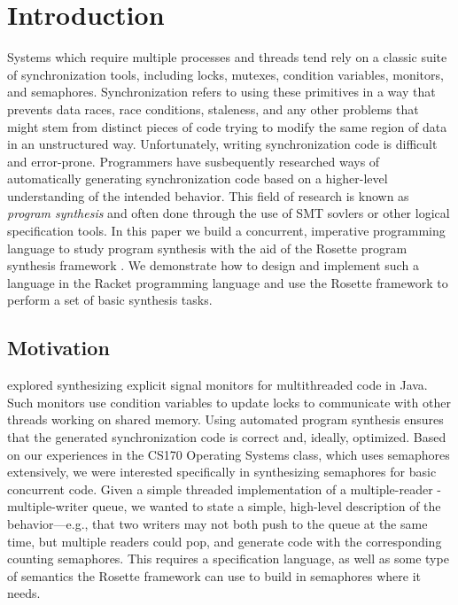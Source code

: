 \section{Introduction}
Systems which require multiple processes and threads tend rely on a classic suite of synchronization tools, including locks, mutexes, condition variables, monitors, and semaphores.  Synchronization refers to using these primitives in a way that prevents data races, race conditions, staleness, and any other problems that might stem from distinct pieces of code trying to modify the same region of data in an unstructured way.  Unfortunately, writing synchronization code is difficult and error-prone.  Programmers have susbequently researched ways of automatically generating synchronization code based on a higher-level understanding of the intended behavior.  This field of research is known as \emph{program synthesis} and often done through the use of SMT sovlers or other logical specification tools.  In this paper we build a concurrent, imperative programming language to study program synthesis with the aid of the Rosette program synthesis framework \citep{torlak2014}.  We demonstrate how to design and implement such a language in the Racket programming language and use the Rosette framework to perform a set of basic synthesis tasks.

\subsection{Motivation}
\cite{ferles2018} explored synthesizing explicit signal monitors for multithreaded code in Java. Such monitors use condition variables to update locks to communicate with other threads working on shared memory. Using automated program synthesis ensures that the generated synchronization code is correct and, ideally, optimized.  Based on our experiences in the CS170 Operating Systems class, which uses semaphores extensively, we were interested specifically in synthesizing semaphores for basic concurrent code.  Given a simple threaded implementation of a multiple-reader -multiple-writer queue, we wanted to state a simple, high-level description of the behavior---e.g., that two writers may not both push to the queue at the same time, but multiple readers could pop, and generate code with the corresponding counting semaphores.  This requires a specification language, as well as some type of semantics the Rosette framework can use to build in semaphores where it needs.  

